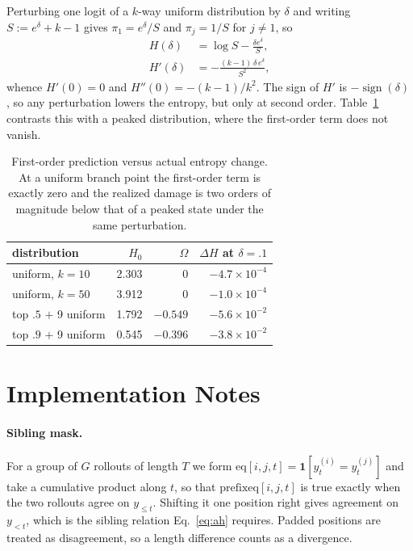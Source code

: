 \documentclass[11pt]{article}
\newcommand{\Om}{\Omega}
\begin{document}
Perturbing one logit of a $k$-way uniform distribution by $\delta$ and writing
$S := e^{\delta} + k - 1$ gives $\pi_1 = e^{\delta}/S$ and $\pi_j = 1/S$ for
$j \neq 1$, so
%
\begin{equation*}
\begin{split}
H(\delta) &= \log S - \frac{\delta e^{\delta}}{S},\\
H'(\delta) &= -\frac{(k-1)\,\delta\, e^{\delta}}{S^{2}},
\end{split}
\end{equation*}
%
whence $H'(0) = 0$ and $H''(0) = -(k-1)/k^{2}$. The sign of $H'$ is
$-\operatorname{sign}(\delta)$, so any perturbation lowers the entropy, but only at
second order. Table~\ref{tab:secondorder} contrasts this with a peaked distribution,
where the first-order term does not vanish.

\begin{table}[h]
\centering
\footnotesize
\begin{tabular}{@{}lrrr@{}}
\toprule
distribution & $H_0$ & $\Om$ & $\Delta H$ at $\delta{=}.1$ \\
\midrule
uniform, $k{=}10$      & 2.303 & $0$      & $-4.7\times10^{-4}$ \\
uniform, $k{=}50$      & 3.912 & $0$      & $-1.0\times10^{-4}$ \\
top $.5$ $+$ 9 uniform & 1.792 & $-0.549$ & $-5.6\times10^{-2}$ \\
top $.9$ $+$ 9 uniform & 0.545 & $-0.396$ & $-3.8\times10^{-2}$ \\
\bottomrule
\end{tabular}
\caption{First-order prediction versus actual entropy change. At a uniform branch
point the first-order term is exactly zero and the realized damage is two orders of
magnitude below that of a peaked state under the same perturbation.}
\label{tab:secondorder}
\end{table}

\section{Implementation Notes}
\label{sec:appendix-impl}

\paragraph{Sibling mask.} For a group of $G$ rollouts of length $T$ we form
$\mathrm{eq}[i,j,t] = \mathbf{1}[y^{(i)}_t = y^{(j)}_t]$ and take a cumulative
product along $t$, so that $\mathrm{prefixeq}[i,j,t]$ is true exactly when the two
rollouts agree on $y_{\le t}$. Shifting it one position right gives agreement on
$y_{<t}$, which is the sibling relation Eq.~\eqref{eq:ah} requires. Padded positions
are treated as disagreement, so a length difference counts as a divergence.
\end{document}
